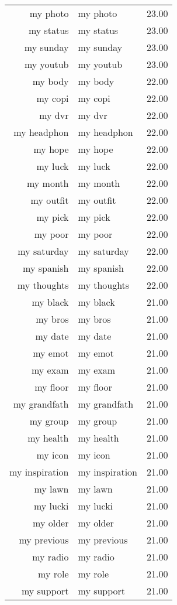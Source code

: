 \begin{table}[ht]
\begin{tabular}{rlr}
  my photo & my photo & 23.00 \\ 
  my status & my status & 23.00 \\ 
  my sunday & my sunday & 23.00 \\ 
  my youtub & my youtub & 23.00 \\ 
  my body & my body & 22.00 \\ 
  my copi & my copi & 22.00 \\ 
  my dvr & my dvr & 22.00 \\ 
  my headphon & my headphon & 22.00 \\ 
  my hope & my hope & 22.00 \\ 
  my luck & my luck & 22.00 \\ 
  my month & my month & 22.00 \\ 
  my outfit & my outfit & 22.00 \\ 
  my pick & my pick & 22.00 \\ 
  my poor & my poor & 22.00 \\ 
  my saturday & my saturday & 22.00 \\ 
  my spanish & my spanish & 22.00 \\ 
  my thoughts & my thoughts & 22.00 \\ 
  my black & my black & 21.00 \\ 
  my bros & my bros & 21.00 \\ 
  my date & my date & 21.00 \\ 
  my emot & my emot & 21.00 \\ 
  my exam & my exam & 21.00 \\ 
  my floor & my floor & 21.00 \\ 
  my grandfath & my grandfath & 21.00 \\ 
  my group & my group & 21.00 \\ 
  my health & my health & 21.00 \\ 
  my icon & my icon & 21.00 \\ 
  my inspiration & my inspiration & 21.00 \\ 
  my lawn & my lawn & 21.00 \\ 
  my lucki & my lucki & 21.00 \\ 
  my older & my older & 21.00 \\ 
  my previous & my previous & 21.00 \\ 
  my radio & my radio & 21.00 \\ 
  my role & my role & 21.00 \\ 
  my support & my support & 21.00 \\ 

\end{tabular}
\end{table}
